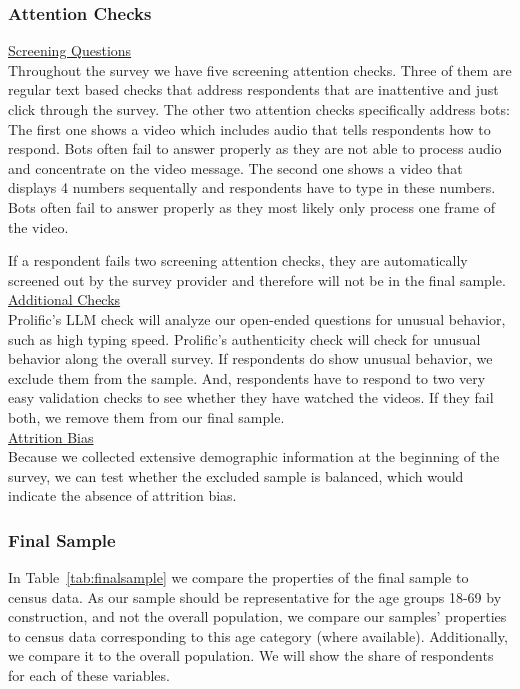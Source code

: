 \documentclass[11pt]{article}
\begin{document}
\FloatBarrier
\subsubsection{Attention Checks}
\underline{Screening Questions}\\
Throughout the survey we have five screening attention checks. Three of them are regular text based checks that address respondents that are inattentive and just click through the survey. The other two attention checks specifically address bots: The first one shows a video which includes audio that tells respondents how to respond. Bots often fail to answer properly as they are not able to process audio and concentrate on the video message. The second one shows a video that displays 4 numbers sequentally and respondents have to type in these numbers. Bots often fail to answer properly as they most likely only process one frame of the video.

If a respondent fails two screening attention checks, they are automatically screened out by the survey provider and therefore will not be in the final sample. \\[0.5em]
\underline{Additional Checks}\\
Prolific's LLM check will analyze our open-ended questions for unusual behavior, such as high typing speed. Prolific's authenticity check will check for unusual behavior along the overall survey. If respondents do show unusual behavior, we exclude them from the sample. And, respondents have to respond to two very easy validation checks to see whether they have watched the videos. If they fail both, we remove them from our final sample.\\[0.5em]
\underline{Attrition Bias} \\
Because we collected extensive demographic information at the beginning of the survey, we can test whether the excluded sample is balanced, which would indicate the absence of attrition bias.
\subsubsection{Final Sample}
In Table~\ref{tab:finalsample} we compare the properties of the final sample to census data. As our sample should be representative for the age groups 18-69 by construction, and not the overall population, we compare our samples' properties to census data corresponding to this age category (where available). Additionally, we compare it to the overall population. We will show the share of respondents for each of these variables. 
\end{document}
